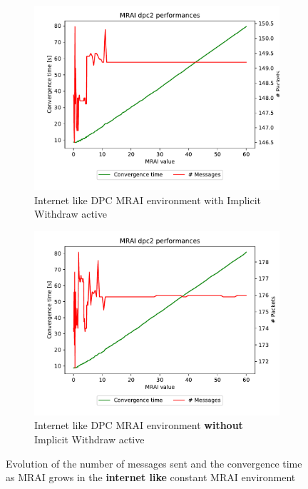 \documentclass[10pt,conference,letterpaper]{IEEEtran}
\newcommand{\figwidth}{0.78}
\newcommand{\figvspace}{-1.5em}
\begin{document}
\begin{figure}[tb]
	\centering

	\begin{subfigure}{\columnwidth}
		\centering
		\includegraphics[width=\figwidth\columnwidth]{images/internet_like/graph-100-dpc/mrai_evolution}
		\caption{Internet like \ac{DPC} \ac{MRAI} environment with Implicit Withdraw active}
		\label{fig:dpc_mrai_evolution_IW}
		\qquad
	\end{subfigure}

	\begin{subfigure}{\columnwidth}
		\centering
		\includegraphics[width=\figwidth\columnwidth]{images/internet_like/graph-100-dpc-noIW/mrai_evolution}
		\caption{Internet like \ac{DPC} \ac{MRAI} environment \textbf{without} Implicit Withdraw active}
		\label{fig:dpc_mrai_evolution_noIW}
		\qquad
	\end{subfigure}

	\caption{Evolution of the number of messages sent and the convergence time as \ac{MRAI} grows
		in the \textbf{internet like} constant \ac{MRAI} environment}
	\label{fig:dpc_mrai_evolution}
	\vspace{\figvspace}
\end{figure}
\end{document}
